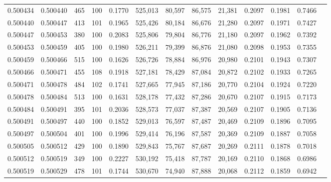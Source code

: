 \begin{tabular}{rrrrrrrrrrrrr}
0.500434 & 0.500440 &   465 & 100 &                                     0.1770 & 525,013 &  80,597 &  86,575 &  21,381 & 0.2097 & 0.1981 & 0.7466 \\
0.500440 & 0.500447 &   413 & 101 &                                     0.1965 & 525,426 &  80,184 &  86,676 &  21,280 & 0.2097 & 0.1971 & 0.7427 \\
0.500447 & 0.500453 &   380 & 100 &                                     0.2083 & 525,806 &  79,804 &  86,776 &  21,180 & 0.2097 & 0.1962 & 0.7392 \\
0.500453 & 0.500459 &   405 & 100 &                                     0.1980 & 526,211 &  79,399 &  86,876 &  21,080 & 0.2098 & 0.1953 & 0.7355 \\
0.500459 & 0.500466 &   515 & 100 &                                     0.1626 & 526,726 &  78,884 &  86,976 &  20,980 & 0.2101 & 0.1943 & 0.7307 \\
0.500466 & 0.500471 &   455 & 108 &                                     0.1918 & 527,181 &  78,429 &  87,084 &  20,872 & 0.2102 & 0.1933 & 0.7265 \\
0.500471 & 0.500478 &   484 & 102 &                                     0.1741 & 527,665 &  77,945 &  87,186 &  20,770 & 0.2104 & 0.1924 & 0.7220 \\
0.500478 & 0.500484 &   513 & 100 &                                     0.1631 & 528,178 &  77,432 &  87,286 &  20,670 & 0.2107 & 0.1915 & 0.7173 \\
0.500484 & 0.500491 &   395 & 101 &                                     0.2036 & 528,573 &  77,037 &  87,387 &  20,569 & 0.2107 & 0.1905 & 0.7136 \\
0.500491 & 0.500497 &   440 & 100 &                                     0.1852 & 529,013 &  76,597 &  87,487 &  20,469 & 0.2109 & 0.1896 & 0.7095 \\
0.500497 & 0.500504 &   401 & 100 &                                     0.1996 & 529,414 &  76,196 &  87,587 &  20,369 & 0.2109 & 0.1887 & 0.7058 \\
0.500505 & 0.500512 &   429 & 100 &                                     0.1890 & 529,843 &  75,767 &  87,687 &  20,269 & 0.2111 & 0.1878 & 0.7018 \\
0.500512 & 0.500519 &   349 & 100 &                                     0.2227 & 530,192 &  75,418 &  87,787 &  20,169 & 0.2110 & 0.1868 & 0.6986 \\
0.500519 & 0.500529 &   478 & 101 &                                     0.1744 & 530,670 &  74,940 &  87,888 &  20,068 & 0.2112 & 0.1859 & 0.6942 \\

\end{tabular}
